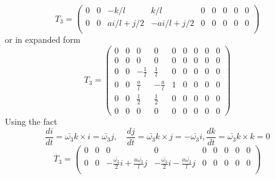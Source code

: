 {\begin{equation}
T_3=
\begin{pmatrix}
0 & 0& -k/l & k/l & 0 &0 & 0 &0 &0\\
0 & 0& ai/l+ j/2& -ai/l+j/2 & 0 &0 & 0 &0 &0\\ 
\end{pmatrix}
\end{equation}
or in expanded form
\begin{equation}
\label{eqn:slip_T3}
T_3=\left(
\begin{array}{ccccccccc}
0 & 0 & 0 & 0 & 0 & 0 & 0 & 0 & 0 \\
0 & 0 & 0 & 0 & 0 & 0 & 0 & 0 & 0 \\
0 & 0 & -\frac{1}{l} & \frac{1}{l} & 0 & 0 & 0 & 0 & 0 \\
0 & 0 & \frac{a}{l} & -\frac{a}{l} & 1 & 0 & 0 & 0 & 0 \\
0 & 0 & \frac{1}{2} & \frac{1}{2} & 0 & 0 & 0 & 0 & 0 \\
0 & 0 & 0 & 0 & 0 & 0 & 0 & 0 & 0
\end{array}
\right)
\end{equation}
Using the fact \[\frac{d i}{dt}=\bar{\omega_3}k\times i =\bar{\omega_3}j, \quad  \frac{d j}{dt}=\bar{\omega_3}k\times j =-\bar{\omega_3}i, \frac{d k}{dt}=\bar{\omega_3}k\times k =0 \] 
\begin{equation}
\label{eqn:slip_dT3}
\dot{T_3}=\begin{pmatrix}
0 & 0& 0 & 0 & 0 &0 & 0 &0 &0\\
0 & 0&-\frac{ \bar{\omega_3}}{2}i +\frac{a \bar{\omega_3}}{l}j& -\frac{ \bar{\omega_3}}{2}i -\frac{a \bar{\omega_3}}{l}j & 0 &0 & 0 &0 &0\\ 
\end{pmatrix}
\end{equation}

}
